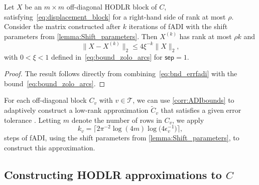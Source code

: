 \documentclass[final,reqno,onefignum,onetabnum]{siamart190516}
\newcommand{\sep}{\mathsf{sep}}
\begin{document}
\begin{corollary}
\label{corr:ADIbounds}
Let $X$ be an $m\times m$ off-diagonal HODLR block of $C$, satisfying~\eqref{eq:displacement_block} for a right-hand side of rank at most $\rho$.
Consider the matrix  constructed after $k$ iterations of fADI with the 
shift parameters  from \cref{lemma:Shift_parameters}.
Then $X^{(k)}$ has rank at most $\rho k$ and
$$ \|X-X^{(k)}\|_2 \leq 4 \xi^{-k} \|X\|_2,$$
with $0 < \xi <1$ defined in~\eqref{eq:bound_zolo_arcs} for $\sep = 1$.
\end{corollary} 
\begin{proof}
The result follows directly from combining~\eqref{eq:bnd_errfadi} with the bound~\eqref{eq:bound_zolo_arcs}. 
\end{proof} 

For each off-diagonal block $C_v$ with $v\in \mathcal T$, we can use \cref{corr:ADIbounds} to adaptively construct a low-rank  approximation $\widetilde{C}_v$  that satisfies a given error tolerance . Letting $m$ denote the number of rows in  $C_v$, we apply
\begin{equation} \label{eq:kv}
k_v =\big\lceil 2\pi^{-2} \log( 4 m ) \log\big( 4 \epsilon^{-1}_v \big) \big\rceil,
\end{equation}
 steps of fADI, using the shift parameters from \cref{lemma:Shift_parameters}, to construct this approximation.
 
\subsection{Constructing HODLR approximations to $C$}
\end{document}
